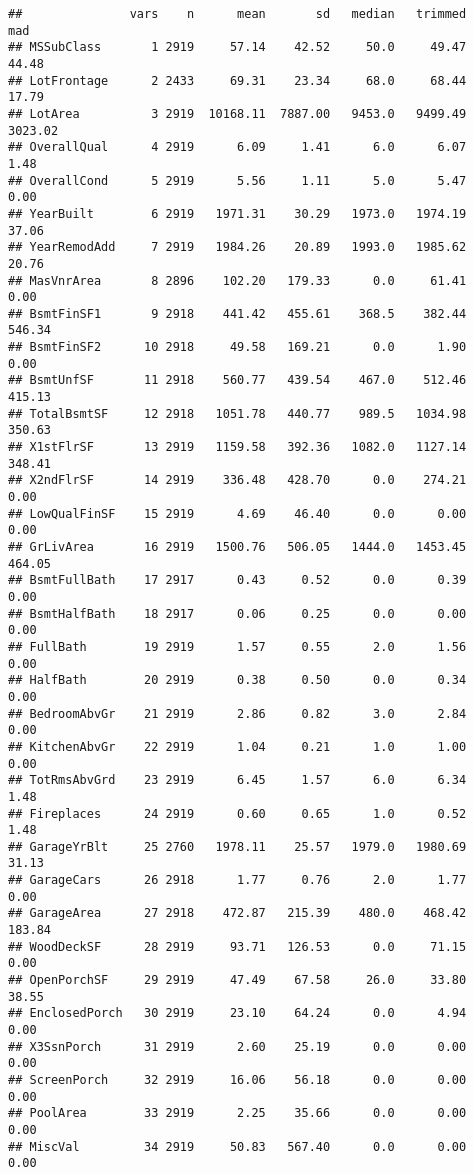 \documentclass[]{article}
\begin{document}
\begin{verbatim}
##               vars    n      mean       sd   median   trimmed      mad
## MSSubClass       1 2919     57.14    42.52     50.0     49.47    44.48
## LotFrontage      2 2433     69.31    23.34     68.0     68.44    17.79
## LotArea          3 2919  10168.11  7887.00   9453.0   9499.49  3023.02
## OverallQual      4 2919      6.09     1.41      6.0      6.07     1.48
## OverallCond      5 2919      5.56     1.11      5.0      5.47     0.00
## YearBuilt        6 2919   1971.31    30.29   1973.0   1974.19    37.06
## YearRemodAdd     7 2919   1984.26    20.89   1993.0   1985.62    20.76
## MasVnrArea       8 2896    102.20   179.33      0.0     61.41     0.00
## BsmtFinSF1       9 2918    441.42   455.61    368.5    382.44   546.34
## BsmtFinSF2      10 2918     49.58   169.21      0.0      1.90     0.00
## BsmtUnfSF       11 2918    560.77   439.54    467.0    512.46   415.13
## TotalBsmtSF     12 2918   1051.78   440.77    989.5   1034.98   350.63
## X1stFlrSF       13 2919   1159.58   392.36   1082.0   1127.14   348.41
## X2ndFlrSF       14 2919    336.48   428.70      0.0    274.21     0.00
## LowQualFinSF    15 2919      4.69    46.40      0.0      0.00     0.00
## GrLivArea       16 2919   1500.76   506.05   1444.0   1453.45   464.05
## BsmtFullBath    17 2917      0.43     0.52      0.0      0.39     0.00
## BsmtHalfBath    18 2917      0.06     0.25      0.0      0.00     0.00
## FullBath        19 2919      1.57     0.55      2.0      1.56     0.00
## HalfBath        20 2919      0.38     0.50      0.0      0.34     0.00
## BedroomAbvGr    21 2919      2.86     0.82      3.0      2.84     0.00
## KitchenAbvGr    22 2919      1.04     0.21      1.0      1.00     0.00
## TotRmsAbvGrd    23 2919      6.45     1.57      6.0      6.34     1.48
## Fireplaces      24 2919      0.60     0.65      1.0      0.52     1.48
## GarageYrBlt     25 2760   1978.11    25.57   1979.0   1980.69    31.13
## GarageCars      26 2918      1.77     0.76      2.0      1.77     0.00
## GarageArea      27 2918    472.87   215.39    480.0    468.42   183.84
## WoodDeckSF      28 2919     93.71   126.53      0.0     71.15     0.00
## OpenPorchSF     29 2919     47.49    67.58     26.0     33.80    38.55
## EnclosedPorch   30 2919     23.10    64.24      0.0      4.94     0.00
## X3SsnPorch      31 2919      2.60    25.19      0.0      0.00     0.00
## ScreenPorch     32 2919     16.06    56.18      0.0      0.00     0.00
## PoolArea        33 2919      2.25    35.66      0.0      0.00     0.00
## MiscVal         34 2919     50.83   567.40      0.0      0.00     0.00

\end{verbatim}
\end{document}
